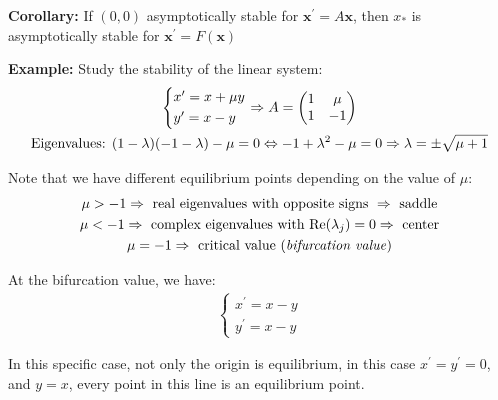 \par\bigskip
\noindent\textbf{Corollary:} If $(0,0)$ asymptotically stable for $\mathbf{x^{\prime}} = A\mathbf{x}$, then $x_*$ is asymptotically stable for $\mathbf{x^{\prime}} = F(\mathbf{x})$ 
\par\bigskip
\noindent\textbf{Example:} Study the stability of the linear system:
\begin{equation*}
  \begin{gathered}
    \begin{cases*}
      x^{\prime} = x+\mu y\\
      y^{\prime} = x-y
      \end{cases*}\Rightarrow A = \begin{pmatrix}1&\mu\\1&-1\end{pmatrix}\\
      \text{Eigenvalues: } (1-\lambda)(-1-\lambda)-\mu=0\Lrarr -1+\lambda^2-\mu = 0\Rightarrow \lambda = \pm\sqrt{\mu+1}
  \end{gathered}
\end{equation*}\par
\noindent Note that we have different equilibrium points depending on the value of $\mu$:
\begin{equation*}
  \begin{gathered}
    \mu>-1\Rightarrow\text{ real eigenvalues with opposite signs }\Rightarrow \text{ saddle}\\
    \mu<-1\Rightarrow\text{ complex eigenvalues with Re$(\lambda_j)=0$}\Rightarrow \text{ center}\\
    \mu=-1\Rightarrow\text{ critical value (\textit{bifurcation value})}
  \end{gathered}
\end{equation*}\par
\noindent At the bifurcation value, we have:
\begin{equation*}
  \begin{gathered}
    \begin{cases*}
      x^{\prime} = x-y\\
      y^{\prime} = x-y
    \end{cases*}
  \end{gathered}
\end{equation*}\par
\noindent In this specific case, not only the origin is equilibrium, in this case $x^{\prime} = y^{\prime} = 0$, and $y=  x$, every point in this line is an equilibrium point.
\par\bigskip

